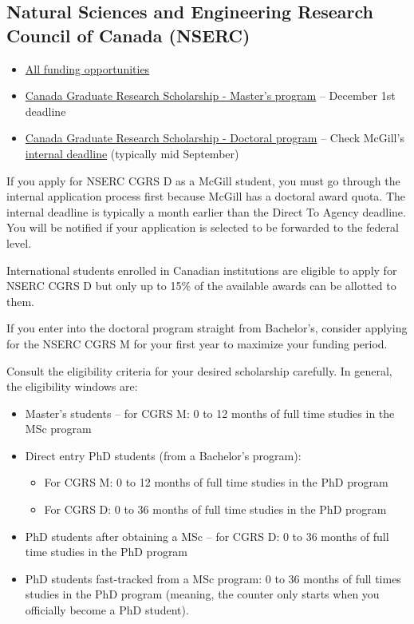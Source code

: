 \subsection{Natural Sciences and Engineering Research Council of Canada (NSERC)} 
\begin{itemize}
    \item \href{https://nserc-crsng.canada.ca/en/funding/funding-opportunity}{All funding opportunities}
    \item \href{https://nserc-crsng.canada.ca/en/funding-opportunity/canada-graduate-research-scholarship-masters-program}{Canada Graduate Research Scholarship - Master's program} -- December 1st deadline
    \item \href{https://nserc-crsng.canada.ca/en/funding-opportunity/canada-graduate-research-scholarship-doctoral-program}{Canada Graduate Research Scholarship - Doctoral program} -- Check McGill's \href{https://www.mcgill.ca/gps/funding/fac-staff/awards/tri-agency-cgrs-d-cihr-nserc-sshrc}{internal deadline} (typically mid September)
\end{itemize}

\begin{plainexercise}
    If you apply for NSERC CGRS D as a McGill student, you must go through the internal application process first because McGill has a doctoral award quota. The internal deadline is typically a month earlier than the Direct To Agency deadline. You will be notified if your application is selected to be forwarded to the federal level.
\end{plainexercise}

International students enrolled in Canadian institutions are eligible to apply for NSERC CGRS D but only up to 15\% of the available awards can be allotted to them.

If you enter into the doctoral program straight from Bachelor's, consider applying for the NSERC CGRS M for your first year to maximize your funding period.

Consult the eligibility criteria for your desired scholarship carefully. In general, the eligibility windows are:
\begin{itemize}
    \item Master's students -- for CGRS M: 0 to 12 months of full time studies in the MSc program
    \item Direct entry PhD students (from a Bachelor's program):
        \begin{itemize}
            \item For CGRS M: 0 to 12 months of full time studies in the PhD program
            \item For CGRS D: 0 to 36 months of full time studies in the PhD program
            \end{itemize}
    \item PhD students after obtaining a MSc -- for CGRS D: 0 to 36 months of full time studies in the PhD program
    \item PhD students fast-tracked from a MSc program: 0 to 36 months of full times studies in the PhD program (meaning, the counter only starts when you officially become a PhD student).
\end{itemize}

